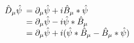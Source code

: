 \begin{equation}
\hat D_{\mu}\hat\psi 
\begin{array}[t]{l}
 =\partial_{\mu}\hat\psi+i\hat B_\mu*\hat\psi \\
=\partial_{\mu}\hat\psi-i\hat\psi*\hat B_\mu \\
=\partial_{\mu}\hat\psi+i(\hat\psi*\hat B_\mu -\hat B_\mu*\hat\psi )
\end{array}
\label{cov}
\end{equation}

